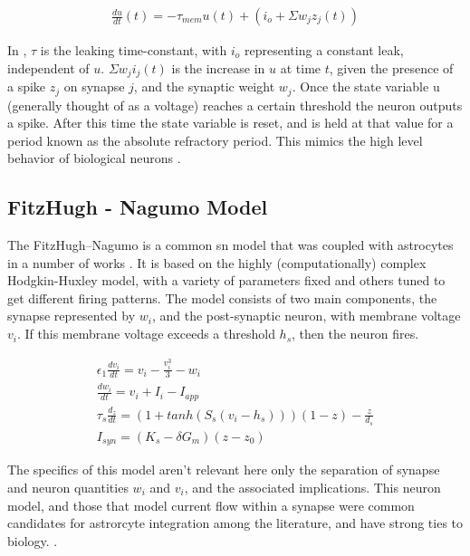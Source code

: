     \begin{align}
        \frac{du}{dt}(t) = -\tau_{mem}u(t)+(i_o + \Sigma w_jz_j(t)) \label{eq:lif}
    \end{align}
    
    In , $\tau$ is the leaking time-constant, with $i_o$
    representing a constant leak, independent of $u$. $\Sigma w_ji_j(t)$ is the
    increase in $u$ at time $t$, given the presence of a spike $z_j$ on synapse
    $j$, and the synaptic weight $w_j$. Once the state variable u (generally
    thought of as a voltage) reaches a certain threshold the neuron outputs a
    spike. After this time the state variable is reset, and is held at that
    value for a period known as the absolute refractory period. This mimics the
    high level behavior of biological neurons \parencite{ponulak_2011}.



    \subsection{FitzHugh - Nagumo Model}
    The FitzHugh–Nagumo is a common \gls{sn} model that was coupled with
    astrocytes in a number of works \parencite{postnov_2009, postnov_2007}. It
    is based on the highly (computationally) complex Hodgkin-Huxley model, with
    a variety of parameters fixed and others tuned to get different firing
    patterns. The model consists of two main components, the synapse represented
    by $w_i$, and the post-synaptic neuron, with membrane voltage $v_i$. If this
    membrane voltage exceeds a threshold $h_s$, then the neuron fires. 

    \begin{align}
      \epsilon_1 \frac{dv_i}{dt} = v_i - \frac{v_i^3}{3} -
      w_i \label{eq:fn_neuron}  \\
      \frac{dw_i}{dt} = v_i + I_i - I_{app} \\
      \tau_s \frac{d_z}{dt} = (1 + tanh(S_s(v_i - h_s)))(1 - z) - \frac{z}{d_s} \label{eq:fitz_nn}
      \\
      I_{syn} = (K_s - \delta G_m)(z - z_0)
    \end{align}

    The specifics of this model aren't relevant here only the separation of
    synapse and neuron quantities $w_i$ and $v_i$, and the associated
    implications. This neuron model, and those that model current flow within a
    synapse were common candidates for astrorcyte integration among the
    literature, and have strong ties to biology. \parencite{wade_2011,
      pitta_2016, postnov_2009}.
    
